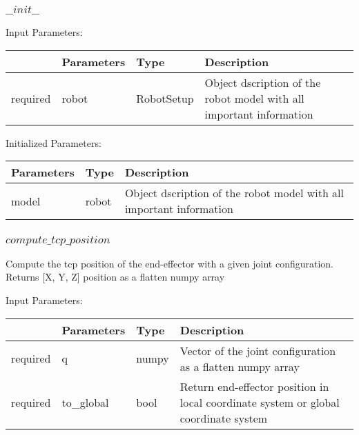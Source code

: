 \documentclass[
	ngerman,
	accentcolor=9c,%
	type=intern,
	marginpar=false
	]{tudapub}
\begin{document}
\subsubsection{$\_\_init\_\_$}
\noindent Input Parameters:
\vspace{0.5cm}

\begin{tabular}{|p{}|p{}|p{}| p{}|}
\hline
 & \textbf{Parameters} & \textbf{Type} & \textbf{Description} \\
\hline
required & robot & RobotSetup & Object dscription of the robot model with all important information \\
\hline
\end{tabular}
\vspace{0.5cm}

\noindent Initialized Parameters:


\vspace{0.5cm}
\begin{tabular}{|p{}| p{}| p{}|}
\hline
\textbf{Parameters} & \textbf{Type} & \textbf{Description} \\
\hline
model & robot & Object dscription of the robot model with all important information \\
\hline
\end{tabular}


\vspace{1cm}

\subsubsection{$compute\_tcp\_position$}
\noindent Compute the tcp position of the end-effector with a given joint configuration. Returns [X, Y, Z] position as a flatten numpy array

\vspace{0.5cm}
\noindent Input Parameters:
\vspace{0.5cm}

\begin{tabular}{|p{}|p{}|p{}| p{}|}
\hline
 & \textbf{Parameters} & \textbf{Type} & \textbf{Description} \\
\hline
required & q & numpy & Vector of the joint configuration as a flatten numpy array \\
\hline
required & to\_global & bool & Return end-effector position in local coordinate system or global coordinate system \\
\hline
\end{tabular}
\vspace{1cm}
\end{document}
